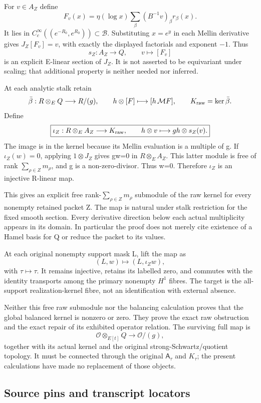 For \(v\in A_Z\) define \[
F_v(x)=\eta(\log x)\sum_\beta(B^{-1}v)_\beta r_\beta(x).
\] It lies in \(C_c^\infty((e^{-R_0},e^{R_0}))\subset\mathscr B\). Substituting \(x=e^y\) in each Mellin derivative gives \(J_Z[F_v]=v\), with exactly the displayed factorials and exponent \(-1\). Thus \[
s_Z:A_Z\longrightarrow Q,\qquad v\longmapsto[F_v]
\] is an explicit E-linear section of \(J_Z\). It is not asserted to be equivariant under scaling; that additional property is neither needed nor inferred.

At each analytic stalk retain \[
\bar\beta:R\otimes_E Q\longrightarrow R/(g),\qquad
h\otimes[F]\longmapsto[h\,\mathcal MF],
\qquad K_{\rm raw}=\ker\bar\beta.
\] Define \[
\boxed{\iota_Z:R\otimes_E A_Z\longrightarrow K_{\rm raw},\qquad
h\otimes v\longmapsto gh\otimes s_Z(v).}
\] The image is in the kernel because its Mellin evaluation is a multiple of g. If \(\iota_Z(w)=0\), applying \(1\otimes J_Z\) gives gw=0 in \(R\otimes_E A_Z\). This latter module is free of rank \(\sum_{\rho\in Z}m_\rho\), and g is a non-zero-divisor. Thus w=0. Therefore \(\iota_Z\) is an injective R-linear map.

This gives an explicit free rank-\(\sum_{\rho\in Z}m_\rho\) submodule of the raw kernel for every nonempty retained packet Z. The map is natural under stalk restriction for the fixed smooth section. Every derivative direction below each actual multiplicity appears in its domain. In particular the proof does not merely cite existence of a Hamel basis for Q or reduce the packet to its values.

At each original nonempty support mask L, lift the map as \[
(L,w)\longmapsto(L,\iota_Zw),
\] with \(\tau\mapsto\tau\). It remains injective, retains its labelled zero, and commutes with the identity transports among the primary nonempty \(H^1\) fibres. The target is the all-support realization-kernel fibre, not an identification with external absence.

Neither this free raw submodule nor the balancing calculation proves that the global balanced kernel is nonzero or zero. They prove the exact raw obstruction and the exact repair of its exhibited operator relation. The surviving full map is \[
\mathcal O\otimes_{E[t]}Q\longrightarrow\mathcal O/(g),
\] together with its actual kernel and the original strong-Schwartz/quotient topology. It must be connected through the original \(\mathsf A_\tau\) and \(K_\tau\); the present calculations have made no replacement of those objects.

\subsection{Source pins and transcript locators}\label{typed-mellin:source-pins-and-transcript-locators}

